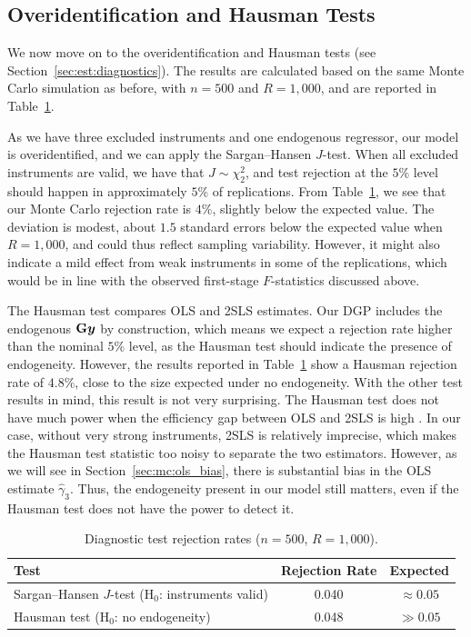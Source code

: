 \subsection{Overidentification and Hausman Tests}
\label{sec:mc:overid}
We now move on to the overidentification and Hausman tests (see Section~\ref{sec:est:diagnostics}). The results are calculated based on the same Monte Carlo simulation as before, with $n = 500$ and $R = 1{,}000$, and are reported in Table~\ref{tab:mc_diagnostics}.

As we have three excluded instruments and one endogenous regressor, our model is overidentified, and we can apply the Sargan--Hansen $J$-test. When all excluded instruments are valid, we have that $J \sim \chi^2_2$, and test rejection at the $5\%$ level should happen in approximately $5\%$ of replications. From Table~\ref{tab:mc_diagnostics}, we see that our Monte Carlo rejection rate is $4\%$, slightly below the expected value. The deviation is modest, about $1.5$ standard errors below the expected value when $R = 1{,}000$, and could thus reflect sampling variability. However, it might also indicate a mild effect from weak instruments in some of the replications, which would be in line with the observed first-stage $F$-statistics discussed above.

The Hausman test compares OLS and 2SLS estimates. Our DGP includes the endogenous $\mathbf{G}\bm{y}$ by construction, which means we expect a rejection rate higher than the nominal $5\%$ level, as the Hausman test should indicate the presence of endogeneity. However, the results reported in Table~\ref{tab:mc_diagnostics} show a Hausman rejection rate of $4.8\%$, close to the size expected under no endogeneity. With the other test results in mind, this result is not very surprising. The Hausman test does not have much power when the efficiency gap between OLS and 2SLS is high \parencite[p.~1258]{Hausman1978}. In our case, without very strong instruments, 2SLS is relatively imprecise, which makes the Hausman test statistic too noisy to separate the two estimators. However, as we will see in Section~\ref{sec:mc:ols_bias}, there is substantial bias in the OLS estimate $\hat\gamma_3$. Thus, the endogeneity present in our model still matters, even if the Hausman test does not have the power to detect it.

\begin{table}[htbp]
\centering
\caption[Diagnostic test rejection rates]{Diagnostic test rejection rates ($n = 500$, $R = 1{,}000$).}
\label{tab:mc_diagnostics}
\begin{tabular}{lcc}
\toprule
Test & Rejection Rate & Expected \\
\midrule
Sargan--Hansen $J$-test (H$_0$: instruments valid) & 0.040 & $\approx 0.05$ \\
Hausman test (H$_0$: no endogeneity) & 0.048 & $\gg 0.05$ \\
\bottomrule
\end{tabular}
\end{table}


